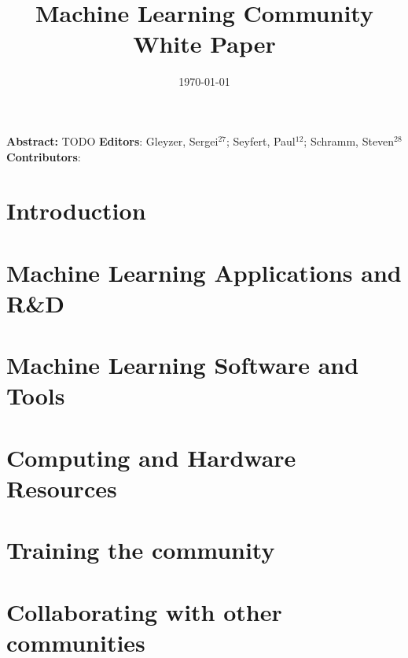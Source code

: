 \documentclass{article}
\title{Machine Learning Community White Paper}
\date{\today}
\begin{document}
\normalsize



\clearpage


\maketitle

\setlength\parindent{0pt}
\textbf{Abstract:} TODO
\vskip 1cm
\textbf{Editors}: Gleyzer, Sergei$^{27}$; Seyfert, Paul$^{12}$; Schramm, Steven$^{28}$\\
\newline
\textbf{Contributors}:


\tableofcontents
\clearpage

\section{Introduction}
\label{sec:introduction}


\section{Machine Learning Applications and R\&D}
\label{sec:applications}


\section{Machine Learning Software and Tools}
\label{sec:software}


%

\section{Computing and Hardware Resources}
\label{sec:resources}


\section{Training the community}
\label{sec:training}


\section{Collaborating with other communities}
\label{sec:collaboration}

\end{document}
